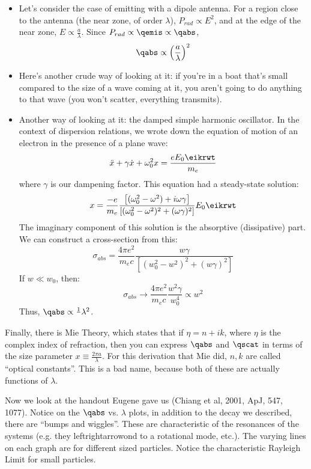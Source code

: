 \documentclass{article}
\def\wz{\omega_0}
\def\inv#1{\frac1{#1}}
\def\inv#1{{\frac{1}{}#1}}
\def\wz{\omega_0}
\begin{document}
\begin{itemize}
\item  Let's consider the case of emitting with a dipole antenna.  For a 
region close to the antenna (the near zone, of order $\lambda$), 
$P_{rad}\propto E^2$, and at the edge of the near zone, 
$E\propto\frac{a}{\lambda}$.  Since $P_{rad}\propto\qemis\propto\qabs$,
$$\qabs\propto\left(\frac{a}{\lambda}\right)^2$$

\item  Here's another crude way of looking at it: 
if you're in a boat that's small compared
to the size of a wave coming at it, you aren't going to do anything to that
wave (you won't scatter, everything transmits).

\item  Another way of looking at it: 
the damped simple harmonic oscillator.  In the context of dispersion relations, we wrote down the equation of motion of an electron in the
presence of a plane wave:
$$\ddot x+\gamma\dot x+\wz^2x=\frac{eE_0\eikrwt}{ m_e}$$
where $\gamma$ is our dampening factor.  This equation had a steady-state solution:
$$x=\frac{-e}{ m_e}\frac{\left[(\wz^2-\omega^2)+i\omega\gamma\right]}{\left[(\wz^2-\omega^2)^2+(\omega\gamma)^2\right]}E_0\eikrwt$$
The imaginary component of this solution is the absorptive (dissipative) part.  We can construct a
cross-section from this:
$$\sigma_{abs} = \frac{4\pi e^2}{m_e c}\frac{w\gamma}{ \left[(w_0^2-w^2)^2 +
(w\gamma)^2\right]}$$
If $w \ll w_0$, then:
$$\sigma_{abs} \to \frac{4\pi e^2}{ m_e c}\frac{w^2\gamma}{ w_0^4} \propto w^2$$
Thus, $\qabs \propto \inv{\lambda^2}$.
\end{itemize}

Finally, there is Mie Theory, which states that if $\eta = n +ik$, where
$\eta$ is the complex index of refraction, then you can express $\qabs$ and
$\qscat$ in terms of the size parameter $x \equiv \frac{2\pi a}{ \lambda}$.
For this derivation that Mie did, $n, k$ are called ``optical constants''.  This
is a bad name, because both of these are actually functions of $\lambda$.\par

Now we look at the handout Eugene gave us (Chiang et al, 2001, ApJ, 547, 1077).
Notice on the $\qabs$ vs. $\lambda$ plots, in addition to the decay we
described, there are ``bumps and wiggles''.  These are characteristic of the
resonances of the systems (e.g. they leftrightarrowond to a rotational mode, etc.).
The varying lines on each graph are for different sized particles.  Notice the
characteristic Rayleigh Limit for small particles. \par
\end{document}
